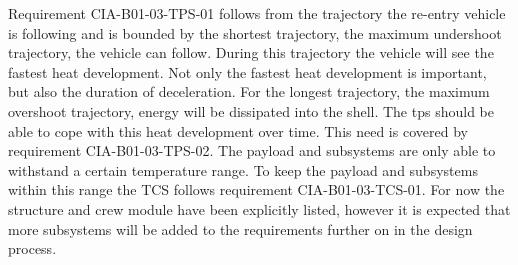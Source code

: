 Requirement CIA-B01-03-TPS-01 follows from the trajectory the re-entry vehicle is following and is bounded by the shortest trajectory, the maximum undershoot trajectory, the vehicle can follow. During this trajectory the vehicle will see the fastest heat development. Not only the fastest heat development is important, but also the duration of deceleration. For the longest trajectory, the maximum overshoot trajectory, energy will be dissipated into the shell. The \gls{tps} should be able to cope with this heat development over time. This need is covered by requirement CIA-B01-03-TPS-02. The payload and subsystems are only able to withstand a certain temperature range. To keep the payload and subsystems within this range the TCS follows requirement CIA-B01-03-TCS-01. For now the structure and crew module have been explicitly listed, however it is expected that more subsystems will be added to the requirements further on in the design process.


